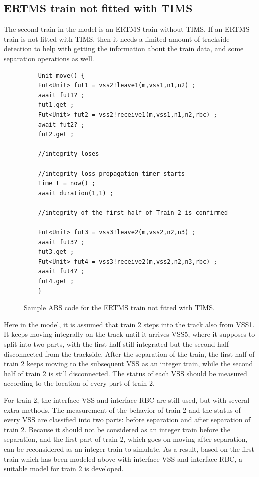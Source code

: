 \documentclass[article,dr=phil,type=drfinal,colorback,accentcolor=tud9c]{tudthesis}
\begin{document}
  \subsection{ERTMS train not fitted with TIMS}
  
  The second train in the model is an ERTMS train without TIMS. If an ERTMS train is not fitted with TIMS, then it needs a limited amount of trackside detection to help with getting the information about the train data, and some separation operations as well.
  
  \begin{figure}[H]
	\begin{lstlisting}
	Unit move() {
	Fut<Unit> fut1 = vss2!leave1(m,vss1,n1,n2) ;
	await fut1? ;
	fut1.get ;
	Fut<Unit> fut2 = vss2!receive1(m,vss1,n1,n2,rbc) ;
	await fut2? ;
	fut2.get ;
	
	//integrity loses
	
	//integrity loss propagation timer starts
	Time t = now() ;
	await duration(1,1) ;
	
	//integrity of the first half of Train 2 is confirmed
	
	Fut<Unit> fut3 = vss3!leave2(m,vss2,n2,n3) ;
	await fut3? ;
	fut3.get ;
	Fut<Unit> fut4 = vss3!receive2(m,vss2,n2,n3,rbc) ;
	await fut4? ;
	fut4.get ;
	}\end{lstlisting}
	\caption[Caption for LOF]{Sample ABS code for the ERTMS train not fitted with TIMS.}
  \end{figure}
    
  Here in the model, it is assumed that train 2 steps into the track also from VSS1. It keeps moving integrally on the track until it arrives VSS5, where it supposes to split into two parts, with the first half still integrated but the second half disconnected from the trackside. After the separation of the train, the first half of train 2 keeps moving to the subsequent VSS as an integer train, while the second half of train 2 is still disconnected. The status of each VSS should be measured according to the location of every part of train 2.
  
  For train 2, the interface VSS and interface RBC are still used, but with several extra methods. The measurement of the behavior of train 2 and the status of every VSS are classified into two parts: before separation and after separation of train 2. Because it should not be considered as an integer train before the separation, and the first part of train 2, which goes on moving after separation, can be reconsidered as an integer train to simulate. As a result, based on the first train which has been modeled above with interface VSS and interface RBC, a suitable model for train 2 is developed.
  
\end{document}
